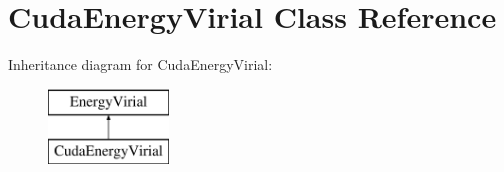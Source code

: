 \hypertarget{classCudaEnergyVirial}{}\section{Cuda\+Energy\+Virial Class Reference}
\label{classCudaEnergyVirial}
Inheritance diagram for Cuda\+Energy\+Virial\+:\begin{figure}[H]
\begin{center}
\leavevmode
\includegraphics[height=2.000000cm]{classCudaEnergyVirial}
\end{center}
\end{figure}

